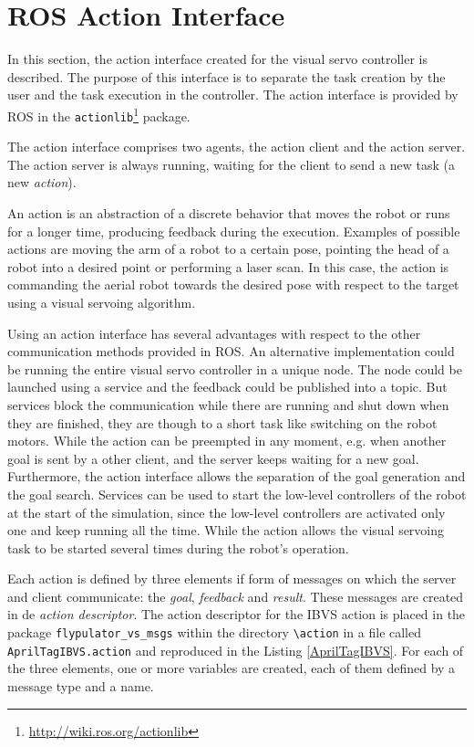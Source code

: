 \section{ROS Action Interface}
\label{sec:ros_action}

In this section, the action interface created for the visual servo controller is described. The purpose of this interface is to separate the task creation by the user and the task execution in the controller. The action interface is provided by ROS in the \texttt{actionlib}\footnote{\url{http://wiki.ros.org/actionlib}} package.

The action interface comprises two agents, the action client and the action server. The action server is always running, waiting for the client to send a new task (a new \emph{action}).

An action \cite{ROS_ComPat} is an abstraction of a discrete behavior that moves the robot or runs for a longer time, producing feedback during the execution. Examples of possible actions are moving the arm of a robot to a certain pose, pointing the head of a robot into a desired point or performing a laser scan. In this case, the action is commanding the aerial robot towards the desired pose with respect to the target using a visual servoing algorithm.

Using an action interface has several advantages with respect to the other communication methods provided in ROS. An alternative implementation could be running the entire visual servo controller in a unique node. The node could be launched using a service and the feedback could be published into a topic. But services block the communication while there are running and shut down when they are finished, they are though to a short task like switching on the robot motors. While the action can be preempted in any moment, e.g. when another goal is sent by a other client, and the server keeps waiting for a new goal. Furthermore, the action interface allows the separation of the goal generation and the goal search. Services can be used to start the low-level controllers of the robot at the start of the simulation, since the low-level controllers are activated only one and keep running all the time. While the action allows the visual servoing task to be started several times during the robot's operation.

 Each action is defined by three elements if form of messages on which the server and client communicate: the \emph{goal}, \emph{feedback} and \emph{result}. These messages are created in de \emph{action descriptor}. The action descriptor for the IBVS action is placed in the package \texttt{flypulator\_vs\_msgs} within the directory \texttt{\textbackslash action} in a file called \texttt{AprilTagIBVS.action} and reproduced in the Listing \ref{AprilTagIBVS}. For each of the three elements, one or more variables are created, each of them defined by a message type and a name.

